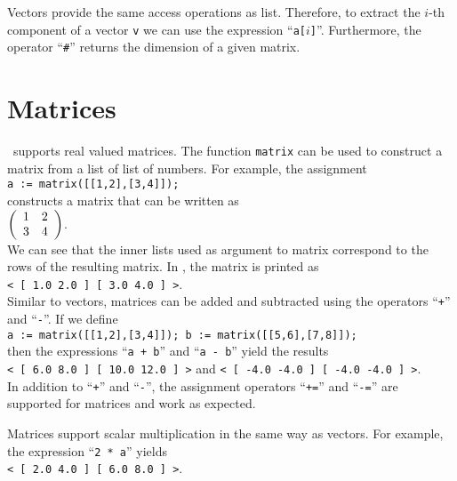 Vectors provide the same access operations as list.  Therefore, to extract the $i$-th component of a
vector \texttt{v} we can use the expression ``\texttt{a[$i$]}''.  Furthermore, the operator
``\texttt{\#}'' returns the dimension of a given matrix.


\section{Matrices}
\setlx\ supports real valued matrices.  The function \texttt{matrix} can be used to construct a
matrix from a list of list of numbers.  For example, the assignment
\\[0.2cm]
\hspace*{1.3cm}
\texttt{a := matrix([[1,2],[3,4]]);}
\\[0.2cm]
constructs a matrix that can be written as
\\[0.2cm]
\hspace*{1.3cm}
$
\left(
\begin{array}[c]{ll}
  1 & 2 \\
  3 & 4
\end{array}
\right)
$.
\\[0.2cm]
We can see that the inner lists used as argument to matrix correspond to the rows of the resulting
matrix.   In \setlx, the matrix is printed as
\\[0.2cm]
\hspace*{1.3cm}
\texttt{< [ 1.0  2.0 ]  [ 3.0  4.0 ] >}.
\\[0.2cm]
Similar to vectors, matrices can be added and subtracted using the operators ``\texttt{+}'' and
``\texttt{-}''.   If we define
\\[0.2cm]
\hspace*{1.3cm}
\texttt{a := matrix([[1,2],[3,4]]);   b := matrix([[5,6],[7,8]]);}   
\\[0.2cm]
then the expressions ``\texttt{a + b}'' and ``\texttt{a - b}'' yield the results
\\[0.2cm]
\hspace*{1.3cm}
\texttt{< [ 6.0  8.0 ]  [ 10.0  12.0 ] >} \quad and \quad \texttt{< [ -4.0  -4.0 ]  [ -4.0  -4.0 ] >}.
\\[0.2cm]
In addition to ``\texttt{+}'' and ``\texttt{-}'', the assignment operators ``\texttt{+=}'' and
``\texttt{-=}'' are supported for matrices and work as expected.

Matrices support scalar multiplication in the same way as vectors.  For example, the expression
``\texttt{2 * a}'' yields
\\[0.2cm]
\hspace*{1.3cm}
\texttt{< [ 2.0  4.0 ]  [ 6.0  8.0 ] >}.
\vspace*{0.2cm} 

